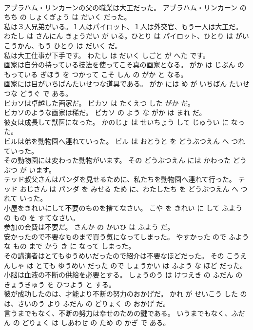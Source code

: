 \documentclass[8pt]{extreport}
\begin{document}
\begin{CJK}{UTF8}{min}
\\	アブラハム・リンカーンの父の職業は大工だった。	アブラハム・リンカーン の ちち の しょくぎょう は だいく だった。	
\\	私は３人兄弟がいる。１人はパイロット、１人は外交官、もう一人は大工だ。	わたし は さんにん きょうだい が いる。ひとり は パイロット、ひとり は がいこうかん、もう ひとり は だいく だ。	
\\	私は大工仕事が下手です。	わたし は だいく しごと が へた です。	
\\	画家は自分の持っている技法を使ってこそ真の画家となる。	がか は じぶん の もっている ぎほう を つかって こそ しん の がか と なる。	
\\	画家には目がいちばんたいせつな道具である。	がか には め が いちばん たいせつな どうぐ で ある。	
\\	ピカソは卓越した画家だ。	ピカソ は たくえつ した がか だ。	
\\	ピカソのような画家は稀だ。	ピカソ の よう な がか は まれ だ。	
\\	彼女は成長して獣医になった。	かのじょ は せいちょう して じゅうい に なった。	
\\	ビルは弟を動物園へ連れていった。	ビル は おとうと を どうぶつえん へ つれていった。	
\\	その動物園には変わった動物がいます。	その どうぶつえん には かわった どうぶつ が います。	
\\	テッド叔父さんはパンダを見せるために、私たちを動物園へ連れて行った。	テッド おじさん は パンダ を みせる ため に、わたしたち を どうぶつえん へ つれて いった。	
\\	小屋をきれいにして不要のものを捨てなさい。	こや を きれい に して ふよう の もの を すてなさい。	
\\	参加の会費は不要だ。	さんか の かいひ は ふよう だ。	
\\	安かったので不要なものまで買う気になってしまった。	やすかった ので ふよう な もの まで かう き に なって しまった。	
\\	その講演者はとてもゆうめいだったので紹介は不要なほどだった。	その こうえんしゃ は とても ゆうめい だった ので しょうかい は ふよう な ほど だった。	
\\	小脳は血液の不断の供給を必要とする。	しょうのう は けつえき の ふだん の きょうきゅう を ひつよう と する。	
\\	彼が成功したのは、才能より不断の努力のおかげだ。	かれ が せいこう した のは、さいのう より ふだん の どりょく の おかげ だ。	
\\	言うまでもなく、不断の努力は幸せのための鍵である。	いうまでもなく、ふだん の どりょく は しあわせ の ため の かぎ で ある。	

\end{CJK}
\end{document}

